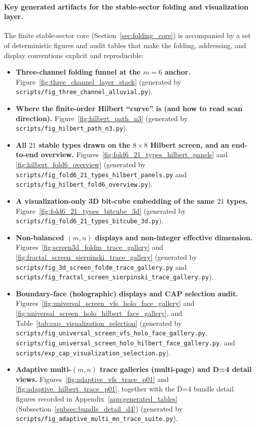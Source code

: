 \paragraph{Key generated artifacts for the stable-sector folding and visualization layer.}
\AuditTag The finite stable-sector core (Section~\ref{sec:folding_core}) is accompanied by a set of deterministic figures and audit tables that make the folding, addressing, and display conventions explicit and reproducible:
\begin{itemize}
\item \textbf{Three-channel folding funnel at the $m=6$ anchor.}
  Figure~\ref{fig:three_channel_layer_stack} (generated by \texttt{scripts/fig\_three\_channel\_alluvial.py}).
\item \textbf{Where the finite-order Hilbert ``curve'' is (and how to read scan direction).}
  Figure~\ref{fig:hilbert_path_n3} (generated by \texttt{scripts/fig\_hilbert\_path\_n3.py}).
\item \textbf{All $21$ stable types drawn on the $8\times 8$ Hilbert screen, and an end-to-end overview.}
  Figures~\ref{fig:fold6_21_types_hilbert_panels} and \ref{fig:hilbert_fold6_overview}
  (generated by \texttt{scripts/fig\_fold6\_21\_types\_hilbert\_panels.py} and \texttt{scripts/fig\_hilbert\_fold6\_overview.py}).
\item \textbf{A visualization-only 3D bit-cube embedding of the same $21$ types.}
  Figure~\ref{fig:fold6_21_types_bitcube_3d} (generated by \texttt{scripts/fig\_fold6\_21\_types\_bitcube\_3d.py}).
\item \textbf{Non-balanced $(m,n)$ displays and non-integer effective dimension.}
  Figures~\ref{fig:screen3d_foldm_trace_gallery} and \ref{fig:fractal_screen_sierpinski_trace_gallery}
  (generated by \texttt{scripts/fig\_3d\_screen\_foldm\_trace\_gallery.py} and \texttt{scripts/fig\_fractal\_screen\_sierpinski\_trace\_gallery.py}).
\item \textbf{Boundary-face (holographic) displays and CAP selection audit.}
  Figures~\ref{fig:universal_screen_vfs_holo_face_gallery} and \ref{fig:universal_screen_holo_hilbert_face_gallery},
  and Table~\ref{tab:cap_visualization_selection}
  (generated by \texttt{scripts/fig\_universal\_screen\_vfs\_holo\_face\_gallery.py},
  \texttt{scripts/fig\_universal\_screen\_holo\_hilbert\_face\_gallery.py},
  and \texttt{scripts/exp\_cap\_visualization\_selection.py}).
\item \textbf{Adaptive multi-$(m,n)$ trace galleries (multi-page) and D=4 detail views.}
  Figures~\ref{fig:adaptive_vfs_trace_p01} and \ref{fig:adaptive_hilbert_trace_p01},
  together with the D=4 bundle detail figures recorded in Appendix~\ref{app:generated_tables}
  (Subsection~\ref{subsec:bundle_detail_d4})
  (generated by \texttt{scripts/fig\_adaptive\_multi\_mn\_trace\_suite.py}).
\end{itemize}

